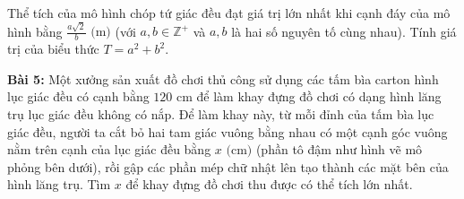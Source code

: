 \documentclass[12pt]{article}
\begin{document}
	Thể tích của mô hình chóp tứ giác đều đạt giá trị lớn nhất khi cạnh đáy của mô hình bằng $\frac{a\sqrt{2}}{b}\text{ (m)}$ (với $a, b \in \mathbb{Z}^+$ và $a, b$ là hai số nguyên tố cùng nhau). Tính giá trị của biểu thức $T = a^2 + b^2$.
	
	\vspace*{0.6cm}
	\noindent \textbf{Bài 5:} Một xưởng sản xuất đồ chơi thủ công sử dụng các tấm bìa carton hình lục giác đều có cạnh bằng $120\text{ cm}$ để làm khay đựng đồ chơi có dạng hình lăng trụ lục giác đều không có nắp. Để làm khay này, từ mỗi đỉnh của tấm bìa lục giác đều, người ta cắt bỏ hai tam giác vuông bằng nhau có một cạnh góc vuông nằm trên cạnh của lục giác đều bằng $x\text{ (cm)}$ (phần tô đậm như hình vẽ mô phỏng bên dưới), rồi gập các phần mép chữ nhật lên tạo thành các mặt bên của hình lăng trụ. Tìm $x$ để khay đựng đồ chơi thu được có thể tích lớn nhất.
	
\end{document}
